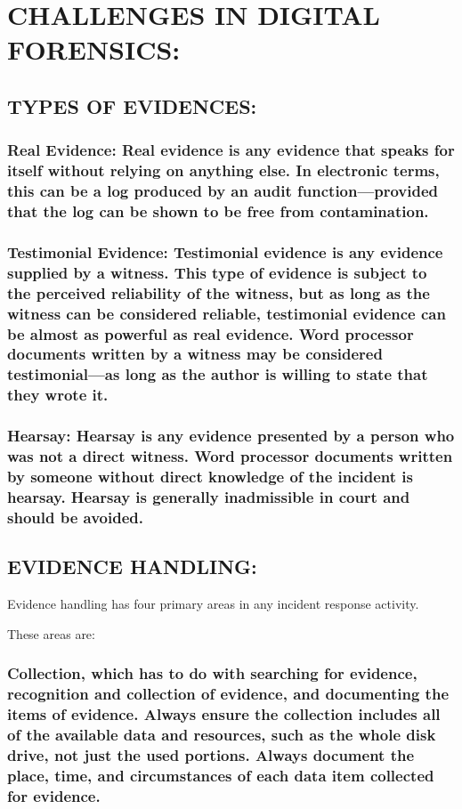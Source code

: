 \documentclass[10pt,british,english]{article}
\begin{document}
\section{CHALLENGES IN DIGITAL FORENSICS:}

\subsection{TYPES OF EVIDENCES:}

\subsubsection{Real Evidence: Real evidence is any evidence that speaks for itself
without relying on anything else. In electronic terms, this can be
a log produced by an audit function---provided that the log can be
shown to be free from contamination.}

\subsubsection{Testimonial Evidence: Testimonial evidence is any evidence supplied
by a witness. This type of evidence is subject to the perceived reliability
of the witness, but as long as the witness can be considered reliable,
testimonial evidence can be almost as powerful as real evidence. Word
processor documents written by a witness may be considered testimonial---as
long as the author is willing to state that they wrote it.}

\subsubsection{Hearsay: Hearsay is any evidence presented by a person who was not
a direct witness. Word processor documents written by someone without
direct knowledge of the incident is hearsay. Hearsay is generally
inadmissible in court and should be avoided.}

\pagebreak{}

\subsection{EVIDENCE HANDLING:}

Evidence handling has four primary areas in any incident response
activity. 

These areas are:

\subsubsection{Collection, which has to do with searching for evidence, recognition
and collection of evidence, and documenting the items of evidence.
Always ensure the collection includes all of the available data and
resources, such as the whole disk drive, not just the used portions.
Always document the place, time, and circumstances of each data item
collected for evidence.}
\end{document}
